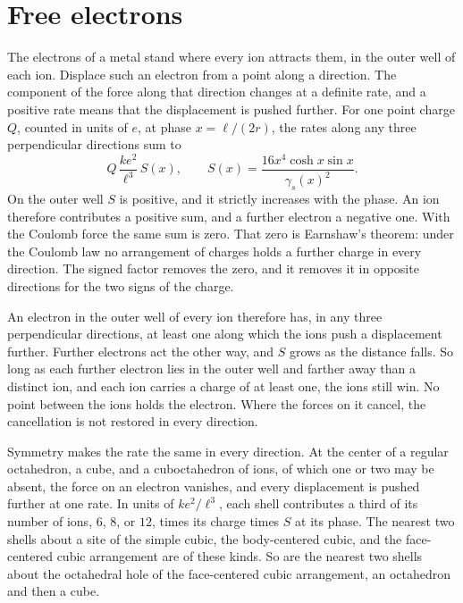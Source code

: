 \documentclass[a4paper]{article}
\begin{document}
\section{Free electrons}
\label{sec:free}

The electrons of a metal stand where every ion attracts them, in the outer well of each ion. Displace such an electron from a point along a direction. The component of the force along that direction changes at a definite rate, and a positive rate means that the displacement is pushed further. For one point charge \(Q\), counted in units of \(e\), at phase \(x=\ell/(2r)\), the rates along any three perpendicular directions sum to
\begin{equation}
\label{eq:outflow}
Q\,\frac{k e^{2}}{\ell^{3}}\,S(x),
\qquad
S(x)=\frac{16x^{4}\cosh x\sin x}{\gamma_s(x)^{2}}.
\end{equation}
On the outer well \(S\) is positive, and it strictly increases with the phase. An ion therefore contributes a positive sum, and a further electron a negative one. With the Coulomb force the same sum is zero. That zero is Earnshaw's theorem: under the Coulomb law no arrangement of charges holds a further charge in every direction. The signed factor removes the zero, and it removes it in opposite directions for the two signs of the charge.

An electron in the outer well of every ion therefore has, in any three perpendicular directions, at least one along which the ions push a displacement further. Further electrons act the other way, and \(S\) grows as the distance falls. So long as each further electron lies in the outer well and farther away than a distinct ion, and each ion carries a charge of at least one, the ions still win. No point between the ions holds the electron. Where the forces on it cancel, the cancellation is not restored in every direction.

Symmetry makes the rate the same in every direction. At the center of a regular octahedron, a cube, and a cuboctahedron of ions, of which one or two may be absent, the force on an electron vanishes, and every displacement is pushed further at one rate. In units of \(k e^{2}/\ell^{3}\), each shell contributes a third of its number of ions, \(6\), \(8\), or \(12\), times its charge times \(S\) at its phase. The nearest two shells about a site of the simple cubic, the body-centered cubic, and the face-centered cubic arrangement are of these kinds. So are the nearest two shells about the octahedral hole of the face-centered cubic arrangement, an octahedron and then a cube.
\end{document}
